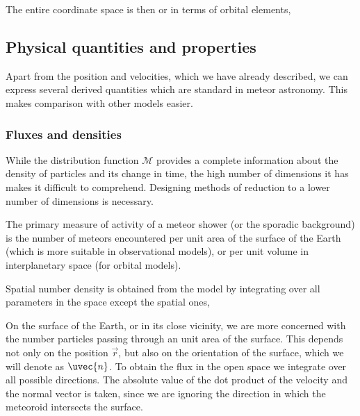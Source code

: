             The entire coordinate space is then
            or in terms of orbital elements,

    \subsection{Physical quantities and properties} \label{mop}
        Apart from the position and velocities, which we have already described, we can express
        several derived quantities which are standard in meteor astronomy. This makes comparison
        with other models easier.

        \subsubsection{Fluxes and densities} \label{mopf}
            While the distribution function $\mathcal{M}$ provides a complete information
            about the density of particles and its change in time,
            the high number of dimensions it has makes it difficult to comprehend.
            Designing methods of reduction to a lower number of dimensions is necessary.

            The primary measure of activity of a meteor shower (or the sporadic background) is the number
            of meteors encountered per unit area of the surface of the Earth (which is more suitable
            in observational models), or per unit volume in interplanetary space (for orbital models).

            Spatial number density is obtained from the model by integrating over all parameters
            in the space except the spatial ones,

            On the surface of the Earth, or in its close vicinity, we are more concerned with
            the number particles passing through an unit area of the surface. This depends not only
            on the position $\vec{r}$, but also on the orientation of the surface, which we will denote as $\uvec{n}$.
            To obtain the flux in the open space we integrate over all possible directions.
            The absolute value of the dot product of the velocity and the normal vector is taken,
            since we are ignoring the direction in which the meteoroid intersects the surface.

